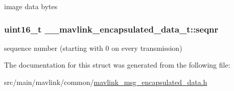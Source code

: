 image data bytes 

\hypertarget{struct____mavlink__encapsulated__data__t_a03045c39478624bab39a02bbf10052f0}{
\subsubsection[{seqnr}]{\setlength{\rightskip}{0pt plus 5cm}uint16\+\_\+t \+\_\+\+\_\+mavlink\+\_\+encapsulated\+\_\+data\+\_\+t\+::seqnr}}\label{struct____mavlink__encapsulated__data__t_a03045c39478624bab39a02bbf10052f0}


sequence number (starting with 0 on every transmission) 



The documentation for this struct was generated from the following file\+:\begin{DoxyCompactItemize}
\item 
src/main/mavlink/common/\hyperlink{mavlink__msg__encapsulated__data_8h}{mavlink\+\_\+msg\+\_\+encapsulated\+\_\+data.\+h}\end{DoxyCompactItemize}
